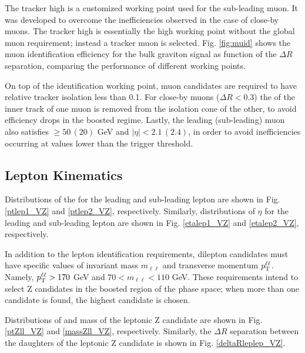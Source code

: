 The tracker high \ptrans is a customized working point used for the sub-leading muon. It was developed to overcome the inefficiencies observed in the case of close-by muons. The tracker high \ptrans is essentially the high \ptrans working point without the global muon requirement; instead a tracker muon is selected. Fig. \ref{fig:muid} shows the muon identification efficiency for the bulk graviton signal as function of the $\Delta R$ separation, comparing the performance of different working points.

On top of the identification working point, muon candidates are required to have relative tracker isolation less than 0.1. For close-by muons ($\Delta R < 0.3$) the \ptrans of the inner track of one muon is removed from the isolation cone of the other, to avoid efficiency drops in the boosted regime. Lastly, the leading (sub-leading) muon also satisfies \ptrans  $\geq 50 \, (20)$  GeV and $|\eta| < 2.1 \, (2.4)$, in order to avoid inefficiencies occurring at values lower than the trigger threshold.

\subsection*{Lepton Kinematics}

Distributions of the \ptrans for the leading and sub-leading lepton are shown in Fig. \ref{ptlep1_VZ} and \ref{ptlep2_VZ}, respectively. Similarly, distributions of $\eta$ for the leading and sub-leading lepton are shown in Fig. \ref{etalep1_VZ} and \ref{etalep2_VZ}, respectively.  

In addition to the lepton identification requirements, dilepton candidates must have specific values of invariant mass $m_{\ell\ell}$ and transverse momentum $p_{\rm T}^{\ell\ell}$. Namely, $p_{\rm T}^{\ell\ell} > 170$  GeV and $70 < m_{\ell\ell} < 110$ GeV. These requirements intend to select Z candidates in the boosted region of the phase space; when more than one candidate is found, the highest \ptrans candidate is chosen.

Distributions of \ptrans and mass of the leptonic Z candidate are shown in Fig. \ref{ptZll_VZ} and \ref{massZll_VZ}, respectively. Similarly, the $\Delta R$ separation between the daughters of the leptonic Z candidate is shown in Fig. \ref{deltaRleplep_VZ}. 

